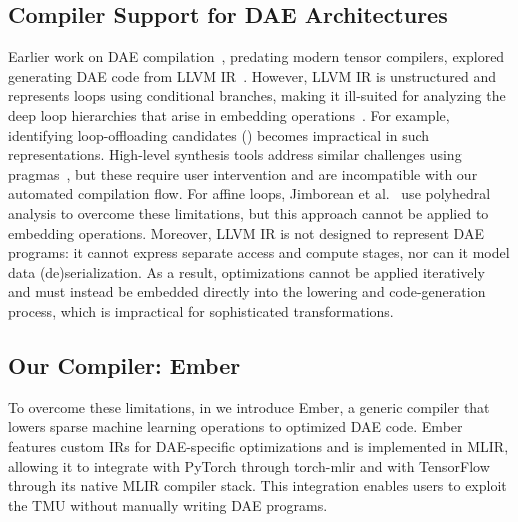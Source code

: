 \subsection{Compiler Support for DAE Architectures} \label{sec:related-work-dae-compiler-support}
Earlier work on DAE compilation~\cite{ham2015micro}, predating modern tensor compilers, explored generating DAE code from LLVM IR~\cite{lattner2004cgo}. However, LLVM IR is unstructured and represents loops using conditional branches, making it ill-suited for analyzing the deep loop hierarchies that arise in embedding operations~\cite{siracusa2020tcad,lopoukhine2025cgo}. For example, identifying loop-offloading candidates () becomes impractical in such representations. High-level synthesis tools address similar challenges using pragmas~\cite{cong2011tcad}, but these require user intervention and are incompatible with our automated compilation flow. For affine loops, Jimborean et al.~\cite{jimborean2018cgo} use polyhedral analysis to overcome these limitations, but this approach cannot be applied to embedding operations. Moreover, LLVM IR is not designed to represent DAE programs: it cannot express separate access and compute stages, nor can it model data (de)serialization. As a result, optimizations cannot be applied iteratively and must instead be embedded directly into the lowering and code-generation process, which is impractical for sophisticated transformations.

\subsection{Our Compiler: Ember} \label{sec:related-work-our-ember}
To overcome these limitations, in  we introduce Ember, a generic compiler that lowers sparse machine learning operations to optimized DAE code. Ember features custom IRs for DAE-specific optimizations and is implemented in MLIR, allowing it to integrate with PyTorch through torch-mlir and with TensorFlow through its native MLIR compiler stack. This integration enables users to exploit the TMU without manually writing DAE programs.

